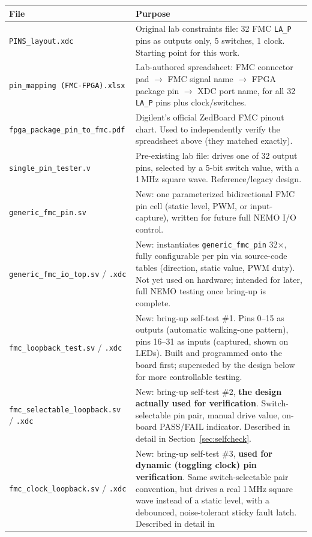 \documentclass[11pt]{article}
\begin{document}
\begin{center}
\begin{tabular}{@{}p{5.2cm}p{9.5cm}@{}}
\toprule
\textbf{File} & \textbf{Purpose} \\
\midrule
\texttt{PINS\_layout.xdc} & Original lab constraints file: 32 FMC \texttt{LA\_P} pins as
outputs only, 5 switches, 1 clock. Starting point for this work. \\
\texttt{pin\_mapping (FMC-FPGA).xlsx} & Lab-authored spreadsheet: FMC connector pad
$\rightarrow$ FMC signal name $\rightarrow$ FPGA package pin $\rightarrow$ XDC port name,
for all 32 \texttt{LA\_P} pins plus clock/switches. \\
\texttt{fpga\_package\_pin\_to\_fmc.pdf} & Digilent's official ZedBoard FMC pinout chart.
Used to independently verify the spreadsheet above (they matched exactly). \\
\texttt{single\_pin\_tester.v} & Pre-existing lab file: drives one of 32 output pins,
selected by a 5-bit switch value, with a 1\,MHz square wave. Reference/legacy design. \\
\texttt{generic\_fmc\_pin.sv} & New: one parameterized bidirectional FMC pin cell
(static level, PWM, or input-capture), written for future full NEMO I/O control. \\
\texttt{generic\_fmc\_io\_top.sv} / \texttt{.xdc} & New: instantiates
\texttt{generic\_fmc\_pin} 32$\times$, fully configurable per pin via source-code tables
(direction, static value, PWM duty). Not yet used on hardware; intended for later,
full NEMO testing once bring-up is complete. \\
\texttt{fmc\_loopback\_test.sv} / \texttt{.xdc} & New: bring-up self-test \#1. Pins 0--15
as outputs (automatic walking-one pattern), pins 16--31 as inputs (captured, shown on
LEDs). Built and programmed onto the board first; superseded by the design below for
more controllable testing. \\
\texttt{fmc\_selectable\_loopback.sv} / \texttt{.xdc} & New: bring-up self-test \#2,
\textbf{the design actually used for verification}. Switch-selectable pin pair, manual
drive value, on-board PASS/FAIL indicator. Described in detail in
Section~\ref{sec:selfcheck}. \\
    \texttt{fmc\_clock\_loopback.sv} / \texttt{.xdc} & New: bring-up self-test \#3,
    \textbf{used for dynamic (toggling clock) pin verification}. Same switch-selectable
    pair convention, but drives a real 1\,MHz square wave instead of a static level, with
    a debounced, noise-tolerant sticky fault latch. Described in detail in

\end{tabular}
\end{center}
\end{document}
